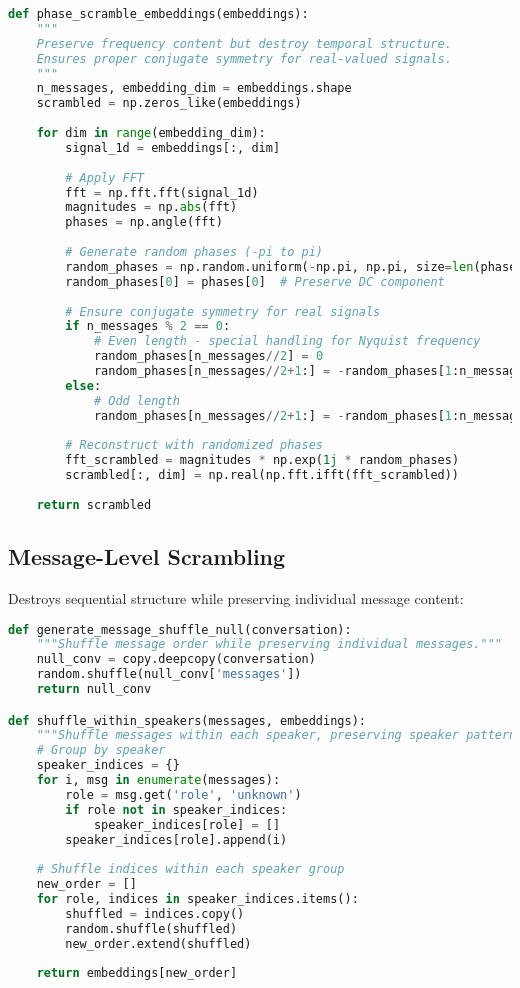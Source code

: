 \documentclass[11pt,letterpaper]{article}
\begin{document}
\begin{lstlisting}[language=Python]
def phase_scramble_embeddings(embeddings):
    """
    Preserve frequency content but destroy temporal structure.
    Ensures proper conjugate symmetry for real-valued signals.
    """
    n_messages, embedding_dim = embeddings.shape
    scrambled = np.zeros_like(embeddings)
    
    for dim in range(embedding_dim):
        signal_1d = embeddings[:, dim]
        
        # Apply FFT
        fft = np.fft.fft(signal_1d)
        magnitudes = np.abs(fft)
        phases = np.angle(fft)
        
        # Generate random phases (-pi to pi)
        random_phases = np.random.uniform(-np.pi, np.pi, size=len(phases))
        random_phases[0] = phases[0]  # Preserve DC component
        
        # Ensure conjugate symmetry for real signals
        if n_messages % 2 == 0:
            # Even length - special handling for Nyquist frequency
            random_phases[n_messages//2] = 0
            random_phases[n_messages//2+1:] = -random_phases[1:n_messages//2][::-1]
        else:
            # Odd length
            random_phases[n_messages//2+1:] = -random_phases[1:n_messages//2+1][::-1]
        
        # Reconstruct with randomized phases
        fft_scrambled = magnitudes * np.exp(1j * random_phases)
        scrambled[:, dim] = np.real(np.fft.ifft(fft_scrambled))
    
    return scrambled
\end{lstlisting}

\subsection{Message-Level Scrambling}

Destroys sequential structure while preserving individual message content:

\begin{lstlisting}[language=Python]
def generate_message_shuffle_null(conversation):
    """Shuffle message order while preserving individual messages."""
    null_conv = copy.deepcopy(conversation)
    random.shuffle(null_conv['messages'])
    return null_conv

def shuffle_within_speakers(messages, embeddings):
    """Shuffle messages within each speaker, preserving speaker patterns."""
    # Group by speaker
    speaker_indices = {}
    for i, msg in enumerate(messages):
        role = msg.get('role', 'unknown')
        if role not in speaker_indices:
            speaker_indices[role] = []
        speaker_indices[role].append(i)
    
    # Shuffle indices within each speaker group
    new_order = []
    for role, indices in speaker_indices.items():
        shuffled = indices.copy()
        random.shuffle(shuffled)
        new_order.extend(shuffled)
    
    return embeddings[new_order]
\end{lstlisting}
\end{document}
